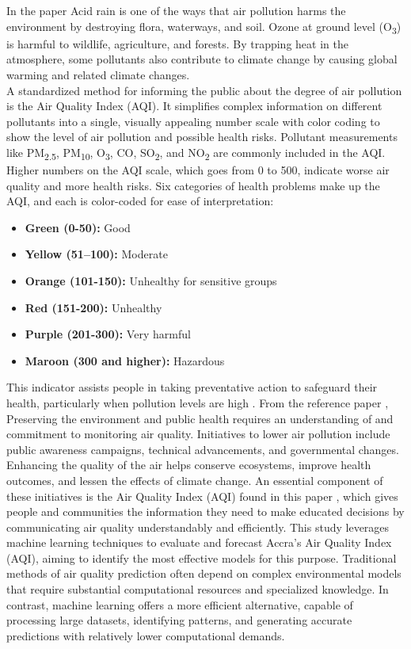 \documentclass{book}
\numberwithin{equation}{section}
\numberwithin{figure}{section}
\begin{document}
In the paper \citep{Ramanathan2008} Acid rain is one of the ways that air pollution harms the environment by destroying flora, waterways, and soil. Ozone at ground level (O\textsubscript{3}) is harmful to wildlife, agriculture, and forests. By trapping heat in the atmosphere, some pollutants also contribute to climate change by causing global warming and related climate changes.\\
A standardized method for informing the public about the degree of air pollution is the Air Quality Index (AQI). It simplifies complex information on different pollutants into a single, visually appealing number scale with color coding to show the level of air pollution and possible health risks. Pollutant measurements like PM\textsubscript{2.5}, PM\textsubscript{10}, O\textsubscript{3}, CO, SO\textsubscript{2}, and NO\textsubscript{2} are commonly included in the AQI.
Higher numbers on the AQI scale, which goes from 0 to 500, indicate worse air quality and more health risks. Six categories of health problems make up the AQI, and each is color-coded for ease of interpretation:
\begin{itemize} 
\item\textbf{Green (0-50):} Good  
\item \textbf{Yellow (51–100):} Moderate 
\item \textbf{Orange (101-150):} Unhealthy for sensitive groups 
\item \textbf{Red (151-200):} Unhealthy
\item \textbf{Purple (201-300):} Very harmful 
\item \textbf{Maroon (300 and higher):} Hazardous 
\end{itemize}
This indicator assists people in taking preventative action to safeguard their health, particularly when pollution levels are high \citep{Huang2015}.
From the reference paper \citep{Miller2020}, Preserving the environment and public health requires an understanding of and commitment to monitoring air quality. Initiatives to lower air pollution include public awareness campaigns, technical advancements, and governmental changes. Enhancing the quality of the air helps conserve ecosystems, improve health outcomes, and lessen the effects of climate change. An essential component of these initiatives is the Air Quality Index (AQI) found in this paper \citep{Strickland2020}, which gives people and communities the information they need to make educated decisions by communicating air quality understandably and efficiently.
This study leverages machine learning techniques to evaluate and forecast Accra's Air Quality Index (AQI), aiming to identify the most effective models for this purpose. Traditional methods of air quality prediction often depend on complex environmental models that require substantial computational resources and specialized knowledge. In contrast, machine learning offers a more efficient alternative, capable of processing large datasets, identifying patterns, and generating accurate predictions with relatively lower computational demands.
\end{document}
